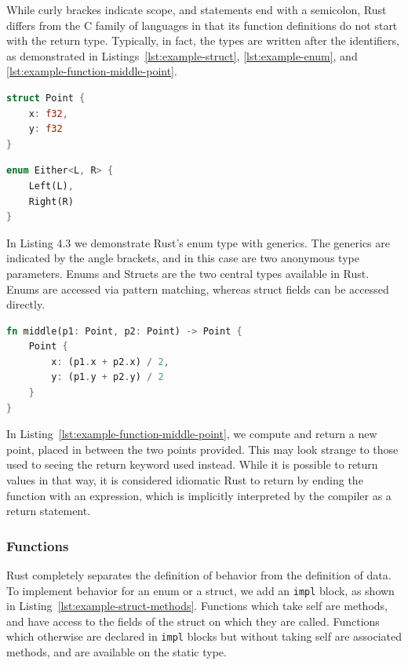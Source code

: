 \documentclass{article}
\begin{document}
While curly brackes indicate scope, and statements end with a semicolon, Rust differs from the C family of languages in that its function definitions do not start with the return type. Typically, in fact, the types are written after the identifiers, as demonstrated in Listings~\ref{lst:example-struct}, \ref{lst:example-enum}, and \ref{lst:example-function-middle-point}.

\begin{lstlisting}[language=Rust, style=boxed, caption=The type definition for a point in two-dimensional space, label=lst:example-struct]
struct Point {
    x: f32,
    y: f32
}
\end{lstlisting}

\begin{lstlisting}[language=Rust, style=boxed, caption=A generic Rust enum, label=lst:example-enum]
enum Either<L, R> {
    Left(L),
    Right(R)
}
\end{lstlisting}

In Listing 4.3 we demonstrate Rust’s enum type with generics. The generics are indicated by the angle brackets, and in this case are two anonymous type parameters.
Enums and Structs are the two central types available in Rust. Enums are accessed via pattern matching, whereas struct fields can be accessed directly.

\begin{lstlisting}[language=Rust, style=boxed, caption=A function to compute the point between two points in two-dimensional space, label=lst:example-function-middle-point]
fn middle(p1: Point, p2: Point) -> Point {
    Point {
        x: (p1.x + p2.x) / 2,
        y: (p1.y + p2.y) / 2
    }
}
\end{lstlisting}

In Listing~\ref{lst:example-function-middle-point}, we compute and return a new point, placed in between the two points provided. This may look strange to those used to seeing the return keyword used instead. While it is possible to return values in that way, it is considered idiomatic Rust to return by ending the function with an expression, which is implicitly interpreted by the compiler as a return statement.

\subsubsection{Functions}
Rust completely separates the definition of behavior from the definition of data. To implement behavior for an enum or a struct, we add an \lstinline{impl} block, as shown in Listing~\ref{lst:example-struct-methods}. Functions which take self are methods, and have access to the fields of the struct on which they are called. Functions which otherwise are declared in \lstinline{impl} blocks but without taking self are associated methods, and are available on the static type.
\end{document}
